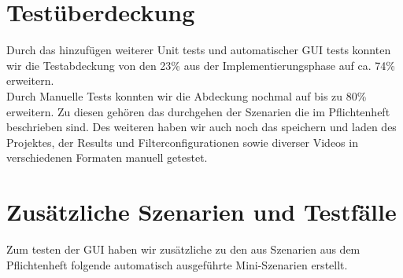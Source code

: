 \documentclass{scrartcl}
\begin{document}
{\section{Testüberdeckung}
Durch das hinzufügen weiterer Unit tests und automatischer GUI tests konnten wir die Testabdeckung von den 23\% aus der Implementierungsphase auf ca. 74\% erweitern.\\
Durch Manuelle Tests konnten wir die Abdeckung nochmal auf bis zu 80\% erweitern. Zu diesen gehören das durchgehen der Szenarien die im Pflichtenheft beschrieben sind. Des weiteren haben wir auch noch das speichern und laden des Projektes, der Results und Filterconfigurationen sowie diverser Videos in verschiedenen Formaten manuell getestet.
\section{Zusätzliche Szenarien und Testfälle}
Zum testen der GUI haben wir zusätzliche zu den aus Szenarien aus dem Pflichtenheft folgende automatisch ausgeführte Mini-Szenarien erstellt.
}
\end{document}
